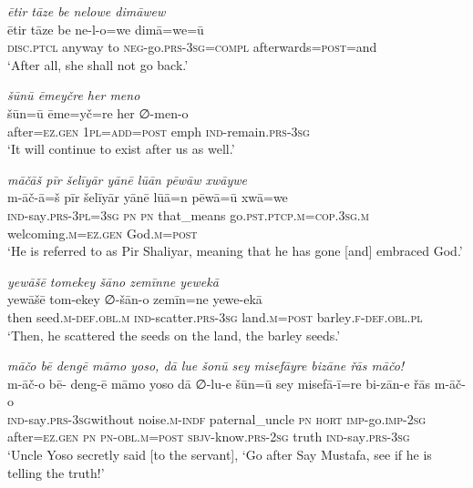 \ea \label{ZP.124}
\textit{ētir tāze be nelowe dimāwew} \\ 
\gll ētir tāze be ne-l-o=we dimā=we=ū \\ 
 \textsc{disc.ptcl} anyway to \textsc{neg-}go\textsc{.prs}\textsc{-3sg}\textsc{=compl} afterwards\textsc{=\textsc{post}}=and \\ 
\glt `After all, she shall not go back.'
\z 
 
\ea \label{ZP.129}
\textit{šūnū ēmeyčre her meno} \\ 
\gll šūn=ū ēme=yč=re her ∅-men-o \\ 
 after\textsc{\textsc{=ez.gen}} \textsc{1pl}\textsc{=add}\textsc{=\textsc{post}} emph \textsc{ind-}remain\textsc{.prs}\textsc{-3sg} \\ 
\glt `It will continue to exist after us as well.'
\z 
 
\ea \label{ŽP.3}
\textit{māčāš pīr šelīyār yānē lūān pēwāw xwāywe} \\ 
\gll m-āč-ā=š pīr šelīyār yānē lūā=n pēwā=ū xwā=we \\ 
 \textsc{ind-}say\textsc{.prs}\textsc{-3pl}\textsc{=3sg} \textsc{pn} \textsc{pn} that\_means go\textsc{.pst}\textsc{.ptcp}\textsc{.m}\textsc{=cop}\textsc{.3sg}\textsc{.m} welcoming\textsc{.m}\textsc{\textsc{=ez.gen}} God\textsc{.m}\textsc{=\textsc{post}} \\ 
\glt `He is referred to as Pir Shaliyar, meaning that he has gone [and] embraced God.'
\z 
 
\ea \label{ŽP.32}
\textit{yewāšē tomekey šāno zemīnne yewekā} \\ 
\gll yewāšē tom-ekey ∅-šān-o zemīn=ne yewe-ekā \\ 
 then seed\textsc{.m}\textsc{-def}\textsc{.obl}\textsc{.m} \textsc{ind-}scatter\textsc{.prs}\textsc{-3sg} land\textsc{.m}\textsc{=\textsc{post}} barley\textsc{.f}\textsc{-def}\textsc{.obl}\textsc{.pl} \\ 
\glt `Then, he scattered the seeds on the land, the barley seeds.'
\z 
 
\ea \label{ŽP.43}
\textit{māčo bē dengē māmo yoso, dā lue šonū sey misefāyre bizāne řās māčo!} \\ 
\gll m-āč-o bē- deng-ē māmo yoso dā ∅-lu-e šūn=ū sey misefā-ī=re bi-zān-e řās m-āč-o \\ 
 \textsc{ind-}say\textsc{.prs}\textsc{-3sg}without noise\textsc{.m}\textsc{-indf} paternal\_uncle \textsc{pn} \textsc{hort} \textsc{imp-}go.\textsc{imp-}\textsc{2sg} after\textsc{\textsc{=ez.gen}} \textsc{pn} \textsc{pn}\textsc{-obl}\textsc{.m}\textsc{=\textsc{post}} \textsc{sbjv-}know\textsc{.prs}-\textsc{2sg} truth \textsc{ind-}say\textsc{.prs}\textsc{-3sg} \\ 
\glt `Uncle Yoso secretly said [to the servant], ‘Go after Say Mustafa, see if he is telling the truth!'
\z 
 
